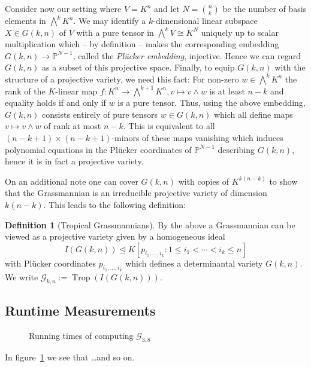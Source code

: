 \documentclass[
  paper=a4,
  DIV=14,
  fontsize=12pt,
  titlepage,
  bibliography=totoc,
  listof=totoc,
  pagesize=pdftex
]{scrartcl}
\numberwithin{figure}{section}
\numberwithin{equation}{section}
\numberwithin{table}{section}
\newcommand*\setP{\mathds{P}}
\let\idealof\trianglelefteq
\DeclareMathOperator{\Trop}{Trop}
\theoremstyle{definition}
\newtheorem{definition}{Definition}
\numberwithin{definition}{section}
\begin{document}
Consider now our setting where $V=K^n$ and let $N = \binom nk$ be the number of basis
elements in $\bigwedge^kK^n$. We may identify a $k$-dimensional linear subspace $X \in
G(k,n)$ of $V$ with a pure tensor in $\bigwedge^kV \cong K^N$ uniquely up to scalar
multiplication which -- by definition -- makes the corresponding embedding $G(k,n) \to
\setP^{N-1}$, called the \emph{Plücker embedding}, injective. Hence we can regard $G(k,n)$
as a subset of this projective space. Finally, to equip $G(k,n)$ with the structure of a
projective variety, we need this fact: For non-zero $w\in \bigwedge^kK^n$ the rank of the
$K$-linear map $f:K^n \to \bigwedge^{k+1}K^n, v \mapsto v \wedge w$ is at least $n-k$ and
equality holds if and only if $w$ is a pure tensor. Thus, using the above embedding,
$G(k,n)$ consists entirely of pure tensors $w\in G(k,n)$ which all define maps $v\mapsto
v\wedge w$ of rank at most $n-k$. This is equivalent to all $(n-k+1) \times
(n-k+1)$-minors of these maps vanishing which induces polynomial equations in the Plücker
coordinates of $\setP^{N-1}$ describing $G(k,n)$, hence it is in fact a projective
variety.

On an additional note one can cover $G(k,n)$ with copies of $K^{k(n-k)}$ to show that the
Grassmannian is an irreducible projective variety of dimension $k(n-k)$. This leads to the
following definition:

\begin{definition}[Tropical Grassmannians]
  By the above a Grassmannian can be viewed as a projective variety given by a homogeneous
  ideal
  \[
    I(G(k,n)) \idealof K[ p_{i_1, \dots, i_k} : 1\leq i_1 < \cdots < i_k \leq n ]
  \]
  with Plücker coordinates $p_{i_1,\dots,i_k}$ which defines a determinantal variety $G(k,
  n)$. We write $\mathcal G_{k,n} := \Trop(I(G(k,n)))$.
\end{definition}

\subsection{Runtime Measurements}

\begin{figure}[htbp]
  \begin{center}
    
  \end{center}
  \caption{Running times of computing $\mathcal{G}_{3,8}$}
  \label{fig:g38scaling}
\end{figure}

In figure~\ref{fig:g38scaling} we see that \dots and so on.
\end{document}
